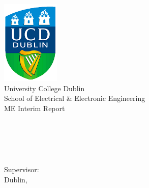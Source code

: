 
\begin{titlepage}
\begin{center}
\includegraphics[height=4cm]{Figures/ucd_logo.png} \\
\LARGE
University College Dublin \\
\Large
School of Electrical \& Electronic Engineering \\
\large
ME Interim Report



\huge
\textbf{\doctitle \\}
\begin{singlespacing}
    \Large
    \authorone \\
    \sauthorone \\
\end{singlespacing}
\vfill
\large
Supervisor: 
\firstCommitteeMember \\



\large
Dublin, \monthYear \\

\end{center}
\end{titlepage} 
